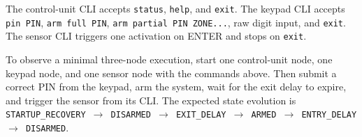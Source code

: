 The control-unit CLI accepts \texttt{status}, \texttt{help}, and \texttt{exit}.
The keypad CLI accepts \texttt{pin PIN}, \texttt{arm full PIN},
\texttt{arm partial PIN ZONE...}, raw digit input, and \texttt{exit}. The
sensor CLI triggers one activation on ENTER and stops on \texttt{exit}.

To observe a minimal three-node execution, start one control-unit node, one
keypad node, and one sensor node with the commands above. Then submit a
correct PIN from the keypad, arm the system, wait for the exit delay to
expire, and trigger the sensor from its CLI. The expected state evolution is
\texttt{STARTUP\_RECOVERY $\rightarrow$ DISARMED $\rightarrow$ EXIT\_DELAY
$\rightarrow$ ARMED $\rightarrow$ ENTRY\_DELAY $\rightarrow$ DISARMED}.
